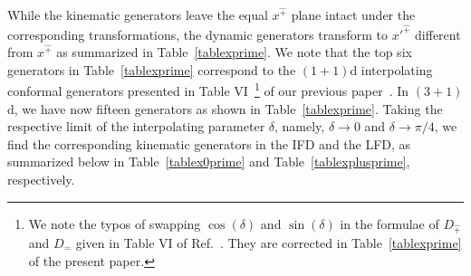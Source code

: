 \documentclass[foundations,article,submit,pdftex,moreauthors]{Definitions/mdpi}
\newcommand{\pT}{\hat{+}}
\begin{document}
While the kinematic generators leave the { equal $x^{\pT}$} plane intact under the corresponding transformations, the dynamic generators transform to $x'^{\pT}$ different from $x^{\pT}$ as summarized in Table~\ref{tablexprime}. {
We note that the top six generators in Table~\ref{tablexprime} correspond to the $(1+1)$d interpolating conformal generators presented in Table VI~\footnote{We note the typos of swapping $\cos(\delta)$ and $\sin(\delta)$ in the formulae of $D_{\hat{+}}$ and $D_{\hat{-}}$ given in Table VI of Ref.~\cite{Ji-Hari-2026-PRD}. They are corrected in Table~\ref{tablexprime} of the present paper.}
of our previous paper~\cite{Ji-Hari-2026-PRD}.
In $(3+1)$d, we have now fifteen generators as shown in Table~\ref{tablexprime}.
Taking the respective limit of the interpolating parameter $\delta$, namely,  
$\delta \to 0$ and $\delta \to \pi/4$, we find the corresponding kinematic generators in the IFD and the LFD, as summarized below in Table~\ref{tablex0prime} and Table~\ref{tablexplusprime}, respectively. }
%
\end{document}
